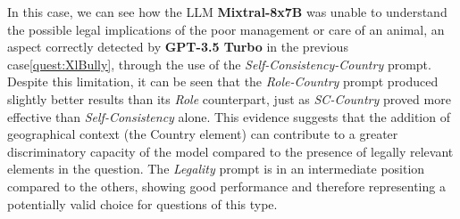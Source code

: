 In this case, we can see how the LLM \textbf{Mixtral-8x7B} was unable to understand the possible legal implications of the poor management or care of an animal, an aspect correctly detected by \textbf{GPT-3.5 Turbo} in the previous case\ref{quest:XlBully}, through the use of the \textit{Self-Consistency-Country} prompt.
Despite this limitation, it can be seen that the \textit{Role-Country} prompt produced slightly better results than its \textit{Role} counterpart, just as \textit{SC-Country} proved more effective than \textit{Self-Consistency} alone.
This evidence suggests that the addition of geographical context (the Country element) can contribute to a greater discriminatory capacity of the model compared to the presence of legally relevant elements in the question.
The \textit{Legality} prompt is in an intermediate position compared to the others, showing good performance and therefore representing a potentially valid choice for questions of this type.

